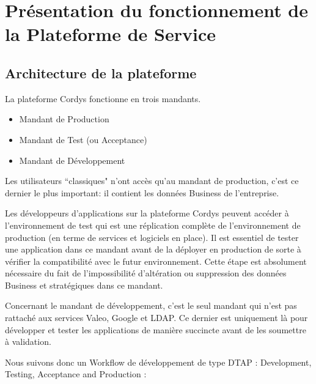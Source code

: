 \section{Présentation du fonctionnement de la Plateforme de Service}

\subsection{Architecture de la plateforme }

La plateforme Cordys fonctionne en trois mandants.
\vspace{4mm}
\begin{itemize}
	\item Mandant de Production
	\item Mandant de Test (ou Acceptance)
	\item Mandant de Développement
\end{itemize}
\vspace{4mm}

Les utilisateurs ``classiques" n'ont accès qu'au mandant de production, c'est ce dernier le plus important: il contient les données Business de l'entreprise.

Les développeurs d'applications sur la plateforme Cordys peuvent accéder à l'environnement de test qui est une réplication complète de l'environnement de production (en terme de services et logiciels en place). Il est essentiel de tester une application dans ce mandant avant de la déployer en production de sorte à vérifier la compatibilité avec le futur environnement. Cette étape est absolument nécessaire du fait de l'impossibilité d'altération ou suppression des données Business et stratégiques dans ce mandant.

Concernant le mandant de développement, c'est le seul mandant qui n'est pas rattaché aux services Valeo, Google et LDAP. Ce dernier est uniquement là pour développer et tester les applications de manière succincte  avant de les soumettre à validation.


Nous suivons donc un Workflow de développement de type DTAP : Development, Testing, Acceptance and Production : 

